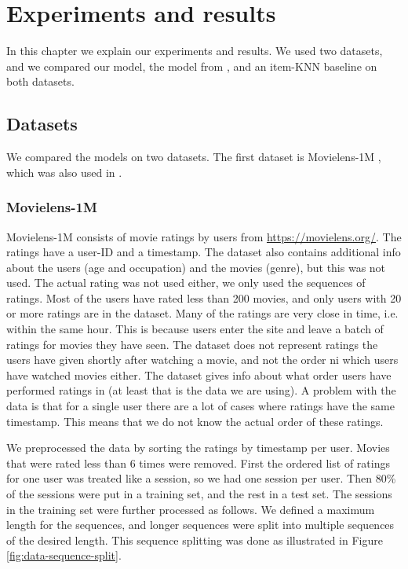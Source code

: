 \chapter{Experiments and results}
In this chapter we explain our experiments and results. We used two datasets, and we compared our model, the model from \cite{DBLP:journals/corr/HidasiKBT15}, and an item-KNN baseline on both datasets.

\section{Datasets}
We compared the models on two datasets. The first dataset is Movielens-1M \cite{dataset:movielens}, which was also used in \cite{DBLP:journals/corr/LiuWWL016}.

\subsection{Movielens-1M}
Movielens-1M consists of movie ratings by users from \href{https://movielens.org/}{https://movielens.org/}. The ratings have a user-ID and a timestamp. The dataset also contains additional info about the users (age and occupation) and the movies (genre), but this was not used. The actual rating was not used either, we only used the sequences of ratings. Most of the users have rated less than 200 movies, and only users with 20 or more ratings are in the dataset. Many of the ratings are very close in time, i.e. within the same hour. This is because users enter the site and leave a batch of ratings for movies they have seen. The dataset does not represent ratings the users have given shortly after watching a movie, and not the order ni which users have watched movies either. The dataset gives info about what order users have performed ratings in (at least that is the data we are using). A problem with the data is that for a single user there are a lot of cases where ratings have the same timestamp. This means that we do not know the actual order of these ratings.

We preprocessed the data by sorting the ratings by timestamp per user. Movies that were rated less than 6 times were removed. First the ordered list of ratings for one user was treated like a session, so we had one session per user. Then 80\% of the sessions were put in a training set, and the rest in a test set. The sessions in the training set were further processed as follows. We defined a maximum length for the sequences, and longer sequences were split into multiple sequences of the desired length. This sequence splitting was done as illustrated in Figure \ref{fig:data-sequence-split}.

